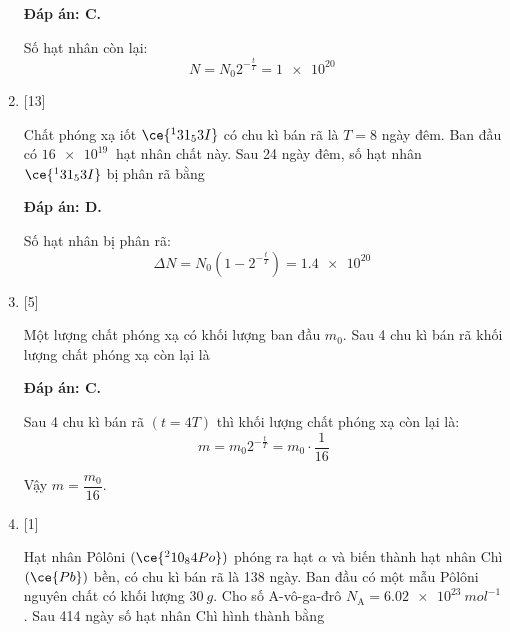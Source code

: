 \begin{enumerate}[label=\bfseries Câu \arabic*:]
	\loigiai
	{		\textbf{Đáp án: C.}
		
		Số hạt nhân còn lại:
		$$N=N_0 2^{-\frac{t}{T}} = \SI{1e20}{}$$
		
	}
	\item {} [13]
	\cauhoi
	{Chất phóng xạ iốt $\ce{^131_53 I}$ có chu kì bán rã là $T=8$ ngày đêm. Ban đầu có $\SI{16e19}{}$ hạt nhân chất này. Sau 24 ngày đêm, số hạt nhân $\ce{^131_53 I}$ bị phân rã bằng
	}
	
	\loigiai
	{		\textbf{Đáp án: D.}
		
		Số hạt nhân bị phân rã:
		$$\Delta N = N_0 (1-2^{-\frac{t}{T}}) = \SI{1.4e20}{}$$
		
	}
	\item {} [5]
	\cauhoi
	{Một lượng chất phóng xạ có khối lượng ban đầu $m_0$. Sau 4 chu kì bán rã khối lượng chất phóng xạ còn lại là
	}
	
	\loigiai
	{		\textbf{Đáp án: C.}
		
		Sau 4 chu kì bán rã $(t=4T)$ thì khối lượng chất phóng xạ còn lại là:
		$$m=m_0 2^{-\frac{t}{T}} = m_0 \cdot \dfrac{1}{16}$$
		
		Vậy $m=\dfrac{m_0}{16}$.
		
	}
	\item {} [1]
	\cauhoi
	{Hạt nhân Pôlôni $(\ce{^210_84 Po})$ phóng ra hạt $\alpha$ và biến thành hạt nhân Chì $(\ce{Pb})$ bền, có chu kì bán rã là 138 ngày. Ban đầu có một mẫu Pôlôni nguyên chất có khối lượng $\SI{30}{g}$. Cho số A-vô-ga-đrô $N_\text{A} = \SI{6.02e23}{mol^{-1}}$. Sau 414 ngày số hạt nhân Chì hình thành bằng
	}
	

\end{enumerate}
